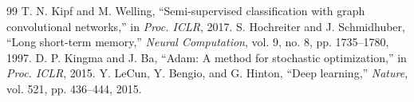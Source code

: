 \documentclass[conference]{IEEEtran}
\begin{document}
\begin{thebibliography}{99}
 T. N. Kipf and M. Welling, ``Semi-supervised classification with graph convolutional networks,'' in \emph{Proc. ICLR}, 2017.
 S. Hochreiter and J. Schmidhuber, ``Long short-term memory,'' \emph{Neural Computation}, vol. 9, no. 8, pp. 1735--1780, 1997.
 D. P. Kingma and J. Ba, ``Adam: A method for stochastic optimization,'' in \emph{Proc. ICLR}, 2015.
 Y. LeCun, Y. Bengio, and G. Hinton, ``Deep learning,'' \emph{Nature}, vol. 521, pp. 436--444, 2015.
\end{thebibliography}
\end{document}
